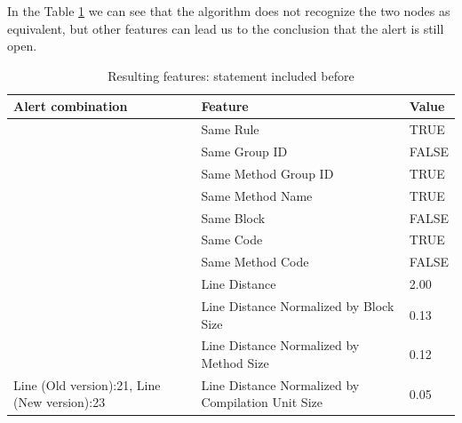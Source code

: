 \documentclass[
]{article}
\begin{document}
\newpage

In the Table \ref{nested_in_other_if} we can see that the algorithm does
not recognize the two nodes as equivalent, but other features can lead
us to the conclusion that the alert is still open.

\small

\begin{table}[!h]

\caption{\label{tab:unnamed-chunk-13}Resulting features: statement included before \label{nested_in_other_if} }
\centering
\begin{tabular}[t]{l|l|l}
\hline
Alert combination & Feature & Value\\
\hline
\rowcolor{gray!6}   & Same Rule & TRUE\\

 & Same Group ID & FALSE\\

\rowcolor{gray!6}   & Same Method Group ID & TRUE\\

 & Same Method Name & TRUE\\

\rowcolor{gray!6}   & Same Block & FALSE\\

 & Same Code & TRUE\\

\rowcolor{gray!6}   & Same Method Code & FALSE\\

 & Line Distance & 2.00\\

\rowcolor{gray!6}   & Line Distance Normalized by Block Size & 0.13\\

 & Line Distance Normalized by Method Size & 0.12\\

\multirow[t]{-11}{*}{\raggedright\arraybackslash Line (Old version):21, Line (New version):23} & Line Distance Normalized by Compilation Unit Size & 0.05\\
\hline
\end{tabular}
\end{table}

\normalsize

\newpage
\end{document}
